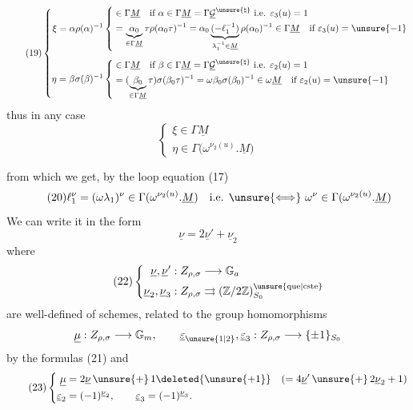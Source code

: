 \[
\tag{19}
\left\{
\begin{aligned}
\xi=\alpha\rho(\alpha)^{-1}
&\left\{
\begin{aligned}
&\in\Gamma\underline M\quad\text{if }\alpha\in\Gamma\underline M=\Gamma\underline{\mathcal G}^{\unsure{\natural}}\ \text{i.e. }\varepsilon_3(u)=1\\
&=\underbrace{\alpha_0}_{\in\Gamma\underline M}\tau\rho(\alpha_0\tau)^{-1}
=\alpha_0\underbrace{(-\ell_1^{-1})}_{\lambda_1^{-1}\in\underline M}\rho(\alpha_0)^{-1}\in\Gamma\underline M\quad\text{if }\varepsilon_3(u)=\unsure{-1}
\end{aligned}\right.\\[1ex]
\eta=\beta\sigma(\beta)^{-1}
&\left\{
\begin{aligned}
&\in\Gamma\underline M\quad\text{if }\beta\in\Gamma\underline M=\Gamma\underline{\mathcal G}^{\unsure{\natural}}\ \text{i.e. }\varepsilon_2(u)=1\\
&=(\underbrace{\beta_0}_{\in\Gamma\underline M}\tau)\sigma(\beta_0\tau)^{-1}
=\omega\beta_0\sigma(\beta_0)^{-1}\in\omega\underline M\quad\text{if }\varepsilon_2(u)=\unsure{-1}
\end{aligned}\right.
\end{aligned}\right.
\]
thus in any case
\[
\tag{19 bis}
\begin{cases}
\xi\in\Gamma\underline M\\
\eta\in\Gamma\bigl(\omega^{\nu_2(u)}.\underline{M}\bigr)
\end{cases}
\]


from which we get, by the loop equation (17)
\[
\tag{20}
\ell_1^{\nu}=(\omega\lambda_1)^{\nu}\in\Gamma(\omega^{\nu_2(u)}.\underline M)
\quad\text{i.e. }\unsure{\Longleftrightarrow}\ \omega^{\nu}\in\Gamma(\omega^{\nu_2(u)}.\underline M)
\]
We can write it in the form
\[
\tag{21}
\underline\nu=2\underline\nu'+\underline\nu_2
\]
where
\[
\tag{22}
\left\{
\begin{aligned}
\underline\nu,\underline\nu' &: Z_{\rho,\sigma}\longrightarrow\mathbb G_a\\
\underline\nu_2,\underline\nu_3 &: Z_{\rho,\sigma}\rightrightarrows
(\mathbb Z/2\mathbb Z)_{S_0}^{\unsure{\mathrm{que}|\mathrm{cste}}}
\end{aligned}\right.
\]
\deleted{$\unsure{\varepsilon}$}
are well-defined  of schemes, related  to the group homomorphisms \deleted{$\unsure{\mu}$}
\[
\underline\mu:Z_{\rho,\sigma}\longrightarrow\mathbb G_m,\qquad
\underline\varepsilon_{\unsure{1|2}},\underline\varepsilon_3:Z_{\rho,\sigma}\longrightarrow\{\pm1\}_{S_0}
\]
by the formulas (21) and
\[
\tag{23}
\left\{
\begin{aligned}
\underline\mu&=2\underline\nu\,\unsure{+}\,1\deleted{\unsure{+1}}
\quad(=4\underline\nu'\,\unsure{+}\,2\underline\nu_2+1)\\
\underline\varepsilon_2&=(-1)^{\underline\nu_2},\qquad
\underline\varepsilon_3=(-1)^{\underline\nu_3}.
\end{aligned}\right.
\]

